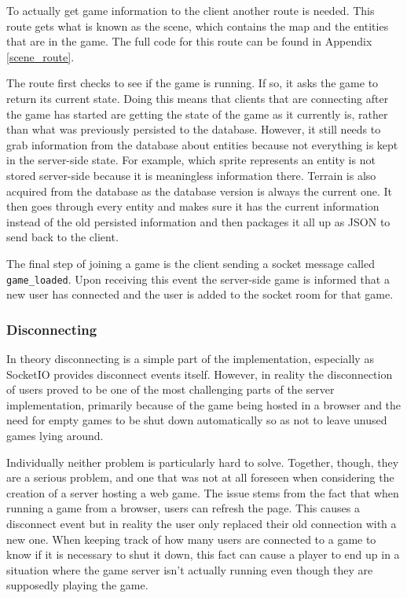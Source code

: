 To actually get game information to the client another route is needed. This route gets what is known as the scene, which contains the map and the entities that are in the game. The full code for this route can be found in Appendix \ref{scene_route}.

The route first checks to see if the game is running. If so, it asks the game to return its current state. Doing this means that clients that are connecting after the game has started are getting the state of the game as it currently is, rather than what was previously persisted to the database. However, it still needs to grab information from the database about entities because not everything is kept in the server-side state. For example, which sprite represents an entity is not stored server-side because it is meaningless information there. Terrain is also acquired from the database as the database version is always the current one. It then goes through every entity and makes sure it has the current information instead of the old persisted information and then packages it all up as JSON to send back to the client.

The final step of joining a game is the client sending a socket message called \texttt{game\_loaded}. Upon receiving this event the server-side game is informed that a new user has connected and the user is added to the socket room for that game.

\subsubsection{Disconnecting}\label{disconnecting}
In theory disconnecting is a simple part of the implementation, especially as SocketIO provides disconnect events itself. However, in reality the disconnection of users proved to be one of the most challenging parts of the server implementation, primarily because of the game being hosted in a browser and the need for empty games to be shut down automatically so as not to leave unused games lying around.

Individually neither problem is particularly hard to solve. Together, though, they are a serious problem, and one that was not at all foreseen when considering the creation of a server hosting a web game. The issue stems from the fact that when running a game from a browser, users can refresh the page. This causes a disconnect event but in reality the user only replaced their old connection with a new one. When keeping track of how many users are connected to a game to know if it is necessary to shut it down, this fact can cause a player to end up in a situation where the game server isn't actually running even though they are supposedly playing the game.

